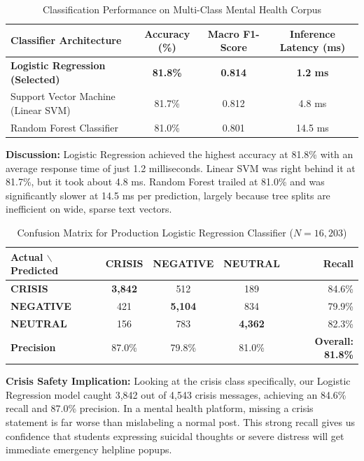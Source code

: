 \documentclass[a4paper,11pt]{report}
\begin{document}
\begin{table}[H]
\centering
\caption{Classification Performance on Multi-Class Mental Health Corpus}
\label{tab:sentiment_results}
\begin{tabular}{lccc}
\toprule
\textbf{Classifier Architecture} & \textbf{Accuracy (\%)} & \textbf{Macro F1-Score} & \textbf{Inference Latency (ms)} \\
\midrule
\textbf{Logistic Regression (Selected)} & \textbf{81.8\%} & \textbf{0.814} & \textbf{1.2 ms} \\
Support Vector Machine (Linear SVM)     & 81.7\%          & 0.812          & 4.8 ms          \\
Random Forest Classifier                & 81.0\%          & 0.801          & 14.5 ms         \\
\bottomrule
\end{tabular}
\end{table}

\noindent \textbf{Discussion:} Logistic Regression achieved the highest accuracy at 81.8\% with an average response time of just 1.2 milliseconds. Linear SVM was right behind it at 81.7\%, but it took about 4.8 ms. Random Forest trailed at 81.0\% and was significantly slower at 14.5 ms per prediction, largely because tree splits are inefficient on wide, sparse text vectors.

\begin{table}[H]
\centering
\caption{Confusion Matrix for Production Logistic Regression Classifier ($N=16,203$)}
\label{tab:confusion_matrix}
\begin{tabular}{l|ccc|r}
\toprule
\textbf{Actual $\backslash$ Predicted} & \textbf{CRISIS} & \textbf{NEGATIVE} & \textbf{NEUTRAL} & \textbf{Recall} \\
\midrule
\textbf{CRISIS}   & \textbf{3,842} & 512            & 189            & 84.6\% \\
\textbf{NEGATIVE} & 421            & \textbf{5,104} & 834            & 79.9\% \\
\textbf{NEUTRAL}  & 156            & 783            & \textbf{4,362} & 82.3\% \\
\midrule
\textbf{Precision} & 87.0\%         & 79.8\%         & 81.0\%         & \textbf{Overall: 81.8\%} \\
\bottomrule
\end{tabular}
\end{table}

\noindent \textbf{Crisis Safety Implication:} Looking at the crisis class specifically, our Logistic Regression model caught 3,842 out of 4,543 crisis messages, achieving an 84.6\% recall and 87.0\% precision. In a mental health platform, missing a crisis statement is far worse than mislabeling a normal post. This strong recall gives us confidence that students expressing suicidal thoughts or severe distress will get immediate emergency helpline popups.
\end{document}
